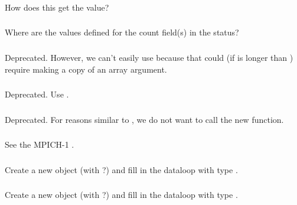 \documentclass{article}
\begin{document}
\subsubsection{}
How does this get the value?

\subsubsection{}
Where are the values defined for the count field(s) in the status?

\subsubsection{}
Deprecated.  However, we can't easily use 
because that could (if  is longer than ) require
making a copy of an array argument.

\subsubsection{}
Deprecated.  Use .

\subsubsection{}
Deprecated.  For reasons similar to , we do not want
to call the new function.

\subsubsection{}
See the MPICH-1 .

\subsubsection{}
Create a new object (with ?) and fill in the dataloop
with type .  

\subsubsection{}
Create a new object (with ?) and fill in the dataloop
with type .
\end{document}
